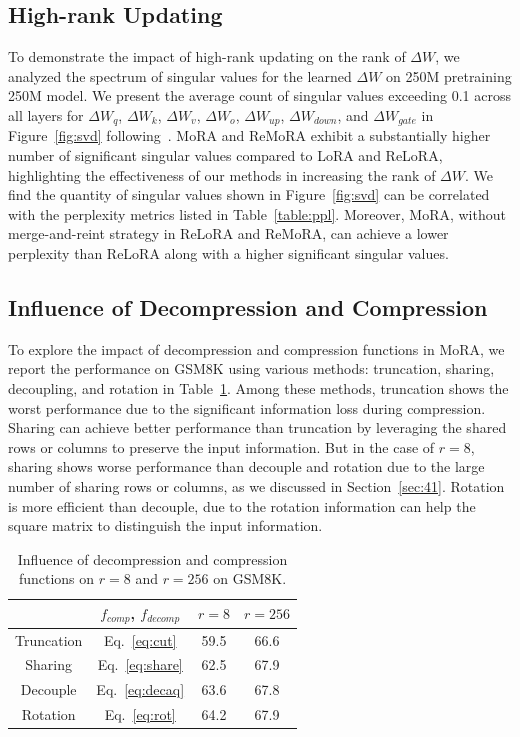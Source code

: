 \documentclass[11pt]{article}
\begin{document}
\subsection{High-rank Updating}
To demonstrate the impact of high-rank updating on the rank of $\Delta W$, we analyzed the spectrum of singular values for the learned $\Delta W$ on 250M pretraining 250M model.
We present the average count of singular values exceeding 0.1 across all layers for $\Delta W_q$, $\Delta W_k$, $\Delta W_v$, $\Delta W_o$, $\Delta W_{up}$, $\Delta W_{down}$, and $\Delta W_{gate}$ in Figure~\ref{fig:svd} following~\cite{lialin2023stack}.
MoRA and ReMoRA exhibit a substantially higher number of significant singular values compared to LoRA and ReLoRA, highlighting the effectiveness of our methods in increasing the rank of $\Delta W$. We find the quantity of singular values shown in Figure~\ref{fig:svd} can be correlated with the perplexity metrics listed in Table~\ref{table:ppl}. Moreover, MoRA, without merge-and-reint strategy in ReLoRA and ReMoRA, can achieve a lower perplexity than ReLoRA along with a higher significant singular values.

\subsection{Influence of Decompression and Compression}

To explore the impact of decompression and compression functions in MoRA, we report the performance on GSM8K using various methods: truncation, sharing, decoupling, and rotation in Table~\ref{table:fun}.
Among these methods, truncation shows the worst performance due to the significant information loss during compression.
Sharing can achieve better performance than truncation by leveraging the shared rows or columns to preserve the input information.
But in the case of $r=8$, sharing shows worse performance than decouple and rotation due to the large number of sharing rows or columns, as we discussed in Section~\ref{sec:41}.
Rotation is more efficient than decouple, due to the rotation information can help the square matrix to distinguish the input information.


\begin{table}[h]
  \small
\centering
\begin{tabular}{cccc}
\toprule
& $f_{comp}$, $f_{decomp}$  & $r=8$ & $r=256$ \\
\midrule
Truncation & Eq.~\ref{eq:cut} & 59.5 &  66.6 \\
Sharing & Eq.~\ref{eq:share} & 62.5  &  67.9 \\
Decouple & Eq.~\ref{eq:decaq} & 63.6 & 67.8 \\
Rotation & Eq.~\ref{eq:rot} & 64.2   &  67.9\\
\bottomrule
\end{tabular}
\caption{Influence of decompression and compression functions on $r=8$ and $r=256$ on GSM8K.}
\label{table:fun}
\end{table}
\end{document}
